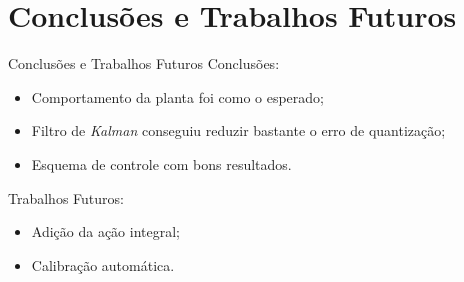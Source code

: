 \section{Conclusões e Trabalhos Futuros}
\begin{frame}{Conclusões e Trabalhos Futuros}
Conclusões:
    \begin{itemize}
        \item Comportamento da planta foi como o esperado;
        \item Filtro de \emph{Kalman} conseguiu reduzir bastante o erro de quantização;
        \item Esquema de controle com bons resultados.
    \end{itemize}

Trabalhos Futuros:    
    \begin{itemize}
        \item Adição da ação integral;
        \item Calibração automática.
    \end{itemize}
\end{frame}
